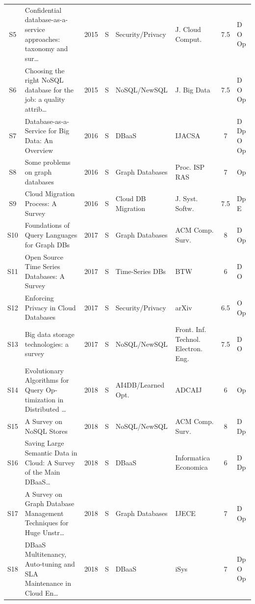 \documentclass[a4paper,fleqn]{cas-sc}
\begin{document}
\begin{landscape}
\begin{longtable}{c p{3.5cm} c c p{2.45cm} p{2.3cm} c p{1.5cm}}
\addlinespace
S5 & Confidential database-as-a-service approaches: taxonomy and sur\ldots{}~\cite{Kohler2015Sec} & 2015 & S & Security/Privacy & J. Cloud Comput. & 7.5 & D O Op \\
\addlinespace
S6 & Choosing the right NoSQL database for the job: a quality attrib\ldots{}~\cite{Lourenco2015NoSQL} & 2015 & S & NoSQL/NewSQL & J. Big Data & 7.5 & D O Op \\
\addlinespace
S7 & Database-as-a-Service for Big Data: An Overview~\cite{Abourezq2016DBaaS} & 2016 & S & DBaaS & IJACSA & 7 & D Dp O Op \\
\addlinespace
S8 & Some problems on graph databases~\cite{Guralnik2016GraphDB} & 2016 & S & Graph Databases & Proc. ISP RAS & 7 & Op \\
\addlinespace
S9 & Cloud Migration Process: A Survey~\cite{Mathew2021CloudMigration} & 2016 & S & Cloud DB Migration & J. Syst. Softw. & 7.5 & Dp E \\
\addlinespace
S10 & Foundations of Query Languages for Graph DBs~\cite{Angles2020GraphDB} & 2017 & S & Graph Databases & ACM Comp. Surv. & 8 & D Op \\
\addlinespace
S11 & Open Source Time Series Databases: A Survey~\cite{Bader2017TSDB} & 2017 & S & Time-Series DBs & BTW & 6 & D O \\
\addlinespace
S12 & Enforcing Privacy in Cloud Databases~\cite{Moghadam2017Sec} & 2017 & S & Security/Privacy & arXiv & 6.5 & O Op \\
\addlinespace
S13 & Big data storage technologies: a survey~\cite{Siddiqa2017NoSQL} & 2017 & S & NoSQL/NewSQL & Front. Inf. Technol. Electron. Eng. & 7.5 & D O \\
\addlinespace
S14 & Evolutionary Algorithms for Query Op-timization in Distributed \ldots{}~\cite{Ali2018AI4DB} & 2018 & S & AI4DB/Learned Opt. & ADCAIJ & 6 & Op \\
\addlinespace
S15 & A Survey on NoSQL Stores~\cite{Davoudian2018NoSQL} & 2018 & S & NoSQL/NewSQL & ACM Comp. Surv. & 8 & D Dp \\
\addlinespace
S16 & Saving Large Semantic Data in Cloud: A Survey of the Main DBaaS\ldots{}~\cite{Iancu2018DBaaS} & 2018 & S & DBaaS & Informatica Economica & 6 & D Dp \\
\addlinespace
S17 & A Survey on Graph Database Management Techniques for Huge Unstr\ldots{}~\cite{Patil2018GraphDB} & 2018 & S & Graph Databases & IJECE & 7 & D Op \\
\addlinespace
S18 & DBaaS Multitenancy, Auto-tuning and SLA Maintenance in Cloud En\ldots{}~\cite{Segalin2018DBaaS} & 2018 & S & DBaaS & iSys & 7 & Dp O Op \\

\end{longtable}
\end{landscape}
\end{document}
